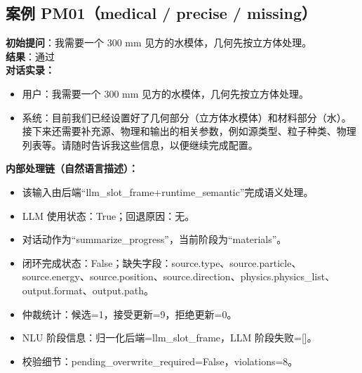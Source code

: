 \documentclass[11pt]{ctexart}
\begin{document}
\subsection{案例 PM01（medical / precise / missing）}
\textbf{初始提问}：我需要一个 300 mm 见方的水模体，几何先按立方体处理。\\
\textbf{结果}：通过\\
\textbf{对话实录：}
\begin{itemize}
\item 用户：我需要一个 300 mm 见方的水模体，几何先按立方体处理。
\item 系统：目前我们已经设置好了几何部分（立方体水模体）和材料部分（水）。接下来还需要补充源、物理和输出的相关参数，例如源类型、粒子种类、物理列表等。请随时告诉我这些信息，以便继续完成配置。
\end{itemize}
\textbf{内部处理链（自然语言描述）：}
\begin{itemize}
\item 该输入由后端“llm\_slot\_frame+runtime\_semantic”完成语义处理。
\item LLM 使用状态：True；回退原因：无。
\item 对话动作为“summarize\_progress”，当前阶段为“materials”。
\item 闭环完成状态：False；缺失字段：source.type、source.particle、source.energy、source.position、source.direction、physics.physics\_list、output.format、output.path。
\item 仲裁统计：候选=1，接受更新=9，拒绝更新=0。
\item NLU 阶段信息：归一化后端=llm\_slot\_frame，LLM 阶段失败=[]。
\item 校验细节：pending\_overwrite\_required=False，violations=8。
\end{itemize}
\end{document}
